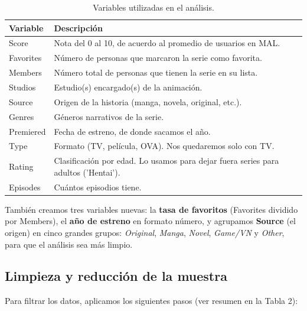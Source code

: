 \documentclass[
  spanish,
  11pt,
  letterpaper,
]{article}
\begin{document}
\begin{longtable}[t]{>{\raggedright\arraybackslash}p{2.2cm}>{\raggedright\arraybackslash}p{12cm}}
\caption{Variables utilizadas en el análisis.}\tabularnewline

\toprule
Variable & Descripción\\
\midrule
Score & Nota del 0 al 10, de acuerdo al promedio de usuarios en MAL.\\
Favorites & Número de personas que marcaron la serie como favorita.\\
Members & Número total de personas que tienen la serie en su lista.\\
Studios & Estudio(s) encargado(s) de la animación.\\
Source & Origen de la historia (manga, novela, original, etc.).\\
\addlinespace
Genres & Géneros narrativos de la serie.\\
Premiered & Fecha de estreno, de donde sacamos el año.\\
Type & Formato (TV, película, OVA). Nos quedaremos solo con TV.\\
Rating & Clasificación por edad. Lo usamos para dejar fuera series para adultos ('Hentai').\\
Episodes & Cuántos episodios tiene.\\
\bottomrule
\end{longtable}

También creamos tres variables nuevas: la \textbf{tasa de favoritos}
(Favorites dividido por Members), el \textbf{año de estreno} en formato
número, y agrupamos \textbf{Source} (el origen) en cinco grandes grupos:
\emph{Original}, \emph{Manga}, \emph{Novel}, \emph{Game/VN} y
\emph{Other}, para que el análisis sea más limpio.

\subsection{Limpieza y reducción de la
muestra}\label{limpieza-y-reducciuxf3n-de-la-muestra}

Para filtrar los datos, aplicamos los siguientes pasos (ver resumen en
la Tabla 2):
\end{document}
